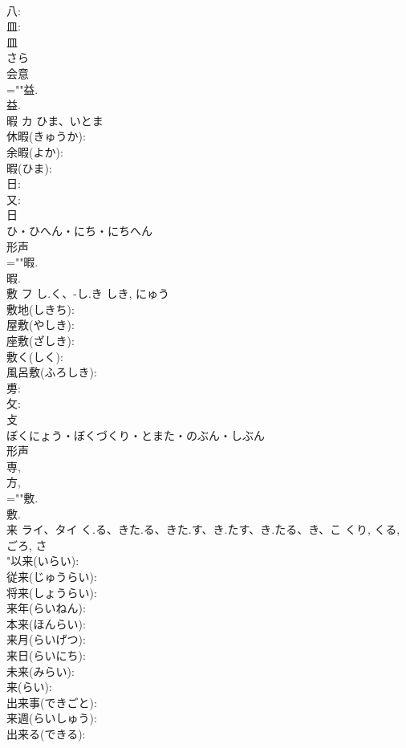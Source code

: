 \documentclass[8pt]{extreport}
\begin{document}
\begin{CJK}{UTF8}{min}
\\	八: 
\\	皿: 
\\	皿	
\\	さら	
\\	会意 
\\	=""益.
\\	益.
\\	暇	カ	ひま、いとま		
\\	休暇(きゅうか): 
\\	余暇(よか): 
\\	暇(ひま): 
\\	日: 
\\	又: 
\\	日	
\\	ひ・ひへん・にち・にちへん	
\\	形声 
\\	=""暇.
\\	暇.
\\	敷	フ	し.く、-し.き	しき, にゅう	
\\	敷地(しきち): 
\\	屋敷(やしき): 
\\	座敷(ざしき): 
\\	敷く(しく): 
\\	風呂敷(ふろしき): 
\\	旉: 
\\	攵: 
\\	攴	
\\	ぼくにょう・ぼくづくり・とまた・のぶん・しぶん	
\\	形声 
\\	専, 
\\	方, 
\\	=""敷.
\\	敷.
\\	来	ライ、タイ	く.る、きた.る、きた.す、き.たす、き.たる、き、こ	くり, くる, ごろ, さ	
\\	"以来(いらい): 
\\	従来(じゅうらい): 
\\	将来(しょうらい): 
\\	来年(らいねん): 
\\	本来(ほんらい): 
\\	来月(らいげつ): 
\\	来日(らいにち): 
\\	未来(みらい): 
\\	来(らい): 
\\	出来事(できごと): 
\\	来週(らいしゅう): 
\\	出来る(できる): 

\end{CJK}
\end{document}
